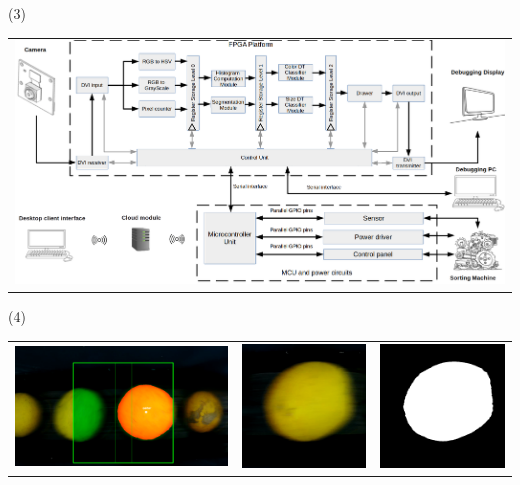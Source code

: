 \begin{frame}{\citetitle{\EntradaBibtex} (3)}
\begin{center}
	\begin{tabular}{c}
		\includegraphics[width=0.65\linewidth]{2023_ConteoNaranjasBandaTransportadora/figs/Figura_ArticuloAntonio_MainSystem_VersionESL.png} \\
	\end{tabular}
\end{center}
\end{frame}



\begin{frame}{\citetitle{\EntradaBibtex} (4)}
\begin{center}
	\begin{tabular}{ccc}
		\includegraphics[width=0.45\linewidth]{2023_ConteoNaranjasBandaTransportadora/figs/framito.png} &
		\includegraphics[width=0.25\linewidth]{2023_ConteoNaranjasBandaTransportadora/figs/blur.png} &
		\includegraphics[width=0.25\linewidth]{2023_ConteoNaranjasBandaTransportadora/figs/blurmask.png} \\
	\end{tabular}
\end{center}
\end{frame}


